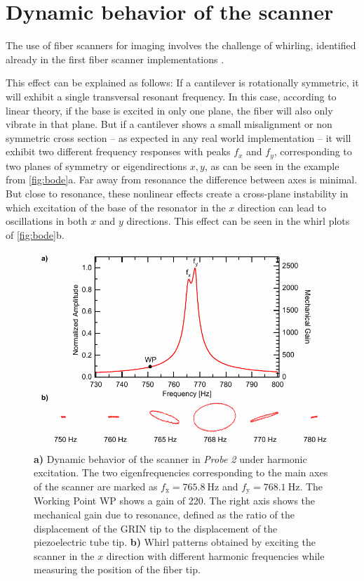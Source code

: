 \documentclass[10pt]{iopart}
\begin{document}
\section{Dynamic behavior of the scanner}
\label{sec:whirling}
The use of fiber scanners for imaging involves the challenge of whirling, identified already in the first fiber scanner implementations \cite{Seibel2001}.

This effect can be explained as follows: If a cantilever is rotationally symmetric, it will exhibit a single transversal resonant frequency. In this case, according to linear theory, if the base is excited in only one plane, the fiber will also only vibrate in that plane. But if a cantilever shows a small misalignment or non symmetric cross section -- as expected in any real world implementation -- it will exhibit two different frequency responses with peaks $f_x$ and $f_y$, corresponding to two planes of symmetry or eigendirections $x,y$, as can be seen in the example from \autoref{fig:bode}a. Far away from resonance the difference between axes is minimal. But close to resonance, these nonlinear effects create a cross-plane instability in which excitation of the base of the resonator in the $x$ direction can lead to oscillations in both $x$ and $y$ directions. This effect can be seen in the whirl plots of \autoref{fig:bode}b. 

\begin{figure}[h!]\centering \includegraphics[width=\columnwidth]{figures/bodeWhirl.pdf}
      \caption{\textbf{a)} Dynamic behavior of the scanner in \textit{Probe 2} under harmonic excitation. The two eigenfrequencies corresponding to the main axes of the scanner are marked as $f_\mathrm{x} = \SI{765.8}{\hertz}$ and $f_\mathrm{y} = \SI{768.1}{\hertz}$.
      The Working Point WP shows a gain of 220. 
      The right axis shows the mechanical gain due to resonance, defined as the ratio of the displacement of the GRIN tip to the displacement of the piezoelectric tube tip.
      \textbf{b)} Whirl patterns obtained by exciting the scanner in the $x$ direction with different harmonic frequencies while measuring the position of the fiber tip. }
      \label{fig:bode}
\end{figure}
\end{document}
